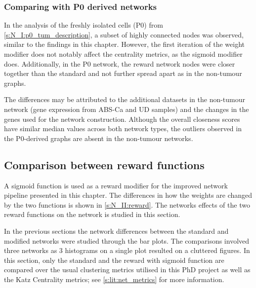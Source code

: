 \subsubsection*{Comparing with P0 derived networks}

In the analysis of the freshly isolated cells (P0) from \cref{s:N_I:p0_tum_description}, a subset of highly connected nodes was observed, similar to the findings in this chapter. However, the first iteration of the weight modifier does not notably affect the centrality metrics, as the sigmoid modifier does. Additionally, in the P0 network, the reward network nodes were closer together than the standard and not further spread apart as in the non-tumour graphs.

The differences may be attributed to the additional datasets in the non-tumour network (gene expression from ABS-Ca and UD samples) and the changes in the genes used for the network construction. Although the overall closeness scores have similar median values across both network types, the outliers observed in the P0-derived graphs are absent in the non-tumour networks.


\subsection{Comparison between reward functions} \label{s:N_II:reward_comp}

A sigmoid function is used as a reward modifier for the improved network pipeline presented in this chapter. The differences in how the weights are changed by the two functions is shown in \cref{s:N_II:reward}. The networks effects of the two reward functions on the network is studied in this section.

In the previous sections the network differences between the standard and modified networks were studied through the bar plots. The comparisons involved three networks as 3 histograms on a single plot resulted on a cluttered figures. In this section, only the standard and the reward with sigmoid function are compared over the usual clustering metrics utilised in this PhD project as well as the Katz Centrality metrics; see \cref{s:lit:net_metrics} for more information.


